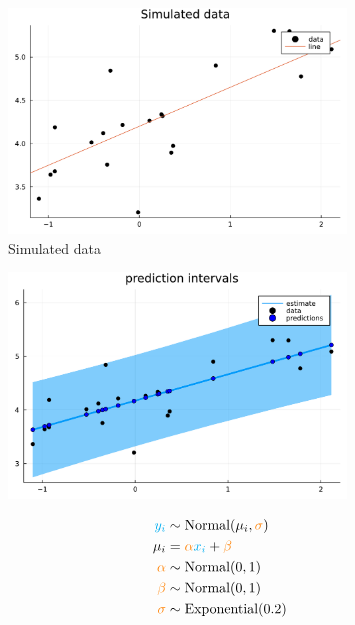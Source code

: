 \documentclass[aspectratio=169,xcolor=svgnames]{beamer}
\begin{document}
\begin{frame}
\begin{figure}[ht]
  \centering
  \includegraphics[width=0.8\textwidth]{figures/linear_data.pdf}
  \caption{\label{fig:label} Simulated data}
\end{figure}
\end{frame}

\begin{frame}
  \begin{figure}[ht]
    \centering
    \includegraphics[width=0.8\textwidth]{figures/linear_prediction_interval.pdf}
    \caption{\label{fig:label} }
  \end{figure}
\end{frame}

\begin{frame}
  \begin{align*}
    \textcolor{cyan}{y_i} &\sim \text{Normal}(\mu_i, \textcolor{orange}{\sigma})\\
    \mu_i &= \textcolor{orange}{\alpha} \textcolor{cyan}{x_i} + \textcolor{orange}{\beta}\\
    \textcolor{orange}{\alpha} &\sim \text{Normal}(0,1)\\
    \textcolor{orange}{\beta} &\sim \text{Normal}(0, 1)\\
    \textcolor{orange}{\sigma} &\sim \text{Exponential}(0.2)\\
  \end{align*}
\end{frame}
\end{document}
